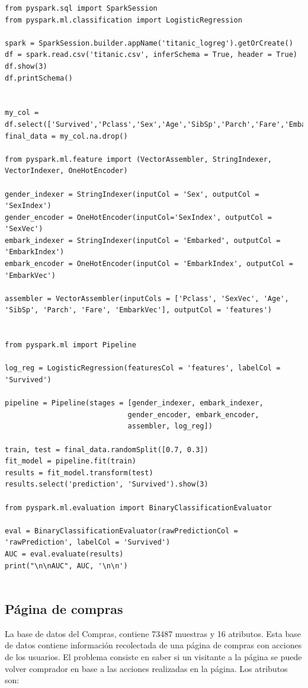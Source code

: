 \documentclass{article}
\begin{document}
\begin{lstlisting}
from pyspark.sql import SparkSession
from pyspark.ml.classification import LogisticRegression

spark = SparkSession.builder.appName('titanic_logreg').getOrCreate()
df = spark.read.csv('titanic.csv', inferSchema = True, header = True)
df.show(3)
df.printSchema()


my_col = df.select(['Survived','Pclass','Sex','Age','SibSp','Parch','Fare','Embarked'])
final_data = my_col.na.drop()

from pyspark.ml.feature import (VectorAssembler, StringIndexer, VectorIndexer, OneHotEncoder)

gender_indexer = StringIndexer(inputCol = 'Sex', outputCol = 'SexIndex')
gender_encoder = OneHotEncoder(inputCol='SexIndex', outputCol = 'SexVec')
embark_indexer = StringIndexer(inputCol = 'Embarked', outputCol = 'EmbarkIndex')
embark_encoder = OneHotEncoder(inputCol = 'EmbarkIndex', outputCol = 'EmbarkVec')

assembler = VectorAssembler(inputCols = ['Pclass', 'SexVec', 'Age', 'SibSp', 'Parch', 'Fare', 'EmbarkVec'], outputCol = 'features')


from pyspark.ml import Pipeline

log_reg = LogisticRegression(featuresCol = 'features', labelCol = 'Survived')

pipeline = Pipeline(stages = [gender_indexer, embark_indexer, 
                             gender_encoder, embark_encoder,
                             assembler, log_reg])

train, test = final_data.randomSplit([0.7, 0.3])
fit_model = pipeline.fit(train)
results = fit_model.transform(test)
results.select('prediction', 'Survived').show(3)

from pyspark.ml.evaluation import BinaryClassificationEvaluator

eval = BinaryClassificationEvaluator(rawPredictionCol = 'rawPrediction', labelCol = 'Survived')
AUC = eval.evaluate(results)
print("\n\nAUC", AUC, '\n\n')


\end{lstlisting}

\subsection{Página de compras}

La base de datos del Compras, contiene 73487 muestras y 16 atributos. Esta base de datos contiene información recolectada de una página de compras con acciones de los usuarios. El problema consiste en saber si un visitante a la página se puede volver comprador en base a las acciones realizadas en la página. Los atributos son:
\end{document}
